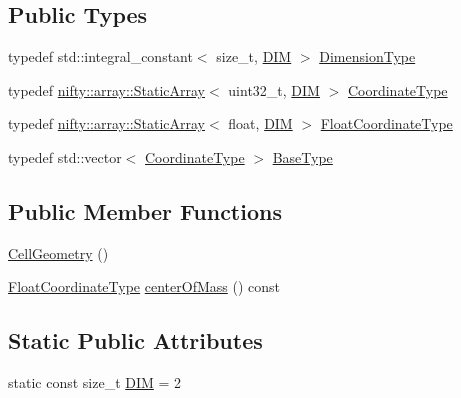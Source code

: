 \subsection*{Public Types}
\begin{DoxyCompactItemize}
\item 
typedef std\+::integral\+\_\+constant$<$ size\+\_\+t, \hyperlink{classnifty_1_1cgp_1_1CellGeometry_3_012_00_011_01_4_a42d125e23384bc4a770893276750d9d1}{D\+I\+M} $>$ \hyperlink{classnifty_1_1cgp_1_1CellGeometry_3_012_00_011_01_4_a35fae8ad3031bc0765ecb4d56cbff171}{Dimension\+Type}
\item 
typedef \hyperlink{namespacenifty_1_1array_a683f151f19c851754e0c6d55ed16a0c2}{nifty\+::array\+::\+Static\+Array}$<$ uint32\+\_\+t, \hyperlink{classnifty_1_1cgp_1_1CellGeometry_3_012_00_011_01_4_a42d125e23384bc4a770893276750d9d1}{D\+I\+M} $>$ \hyperlink{classnifty_1_1cgp_1_1CellGeometry_3_012_00_011_01_4_a61e8ffb089e3ca4bf7998e77dfc278bc}{Coordinate\+Type}
\item 
typedef \hyperlink{namespacenifty_1_1array_a683f151f19c851754e0c6d55ed16a0c2}{nifty\+::array\+::\+Static\+Array}$<$ float, \hyperlink{classnifty_1_1cgp_1_1CellGeometry_3_012_00_011_01_4_a42d125e23384bc4a770893276750d9d1}{D\+I\+M} $>$ \hyperlink{classnifty_1_1cgp_1_1CellGeometry_3_012_00_011_01_4_aa894ce050b43284dac01b3963e2e1e47}{Float\+Coordinate\+Type}
\item 
typedef std\+::vector$<$ \hyperlink{classnifty_1_1cgp_1_1CellGeometry_3_012_00_011_01_4_a61e8ffb089e3ca4bf7998e77dfc278bc}{Coordinate\+Type} $>$ \hyperlink{classnifty_1_1cgp_1_1CellGeometry_3_012_00_011_01_4_a10f7d7a27ef9080c3a94fc69a258c55e}{Base\+Type}
\end{DoxyCompactItemize}
\subsection*{Public Member Functions}
\begin{DoxyCompactItemize}
\item 
\hyperlink{classnifty_1_1cgp_1_1CellGeometry_3_012_00_011_01_4_ae525aaf64790b4c76c17208a13588101}{Cell\+Geometry} ()
\item 
\hyperlink{classnifty_1_1cgp_1_1CellGeometry_3_012_00_011_01_4_aa894ce050b43284dac01b3963e2e1e47}{Float\+Coordinate\+Type} \hyperlink{classnifty_1_1cgp_1_1CellGeometry_3_012_00_011_01_4_ae8510d5f8494ee259cd105eb8342a494}{center\+Of\+Mass} () const 
\end{DoxyCompactItemize}
\subsection*{Static Public Attributes}
\begin{DoxyCompactItemize}
\item 
static const size\+\_\+t \hyperlink{classnifty_1_1cgp_1_1CellGeometry_3_012_00_011_01_4_a42d125e23384bc4a770893276750d9d1}{D\+I\+M} = 2
\end{DoxyCompactItemize}
